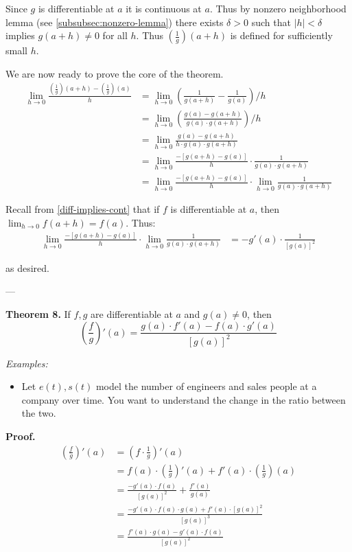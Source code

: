 \vs

Since $g$ is differentiable at $a$ it is continuous at $a$. Thus by
nonzero neighborhood lemma (see \ref{subsubsec:nonzero-lemma}) there
exists $\delta>0$ such that $|h|<\delta$ implies $g(a+h)\neq0$ for all
$h$. Thus $\left(\frac{1}{g}\right)(a+h)$ is defined for sufficiently
small $h$.

\vs

We are now ready to prove the core of the theorem.
\begin{align*}
  \lim_{h\to0}\frac{\left(\frac{1}{g}\right)(a+h)-\left(\frac{1}{g}\right)(a)}{h}
  &=\lim_{h\to0}\left(\frac{1}{g(a+h)}-\frac{1}{g(a)}\right)/h\\
  &=\lim_{h\to0}\left(\frac{g(a)-g(a+h)}{g(a)\cdot g(a+h)}\right)/h\\
  &=\lim_{h\to0}\frac{g(a)-g(a+h)}{h\cdot g(a)\cdot g(a+h)}\\
  &=\lim_{h\to0}\frac{-[g(a+h)-g(a)]}{h}\cdot\frac{1}{g(a)\cdot g(a+h)}\\
  &=\lim_{h\to0}\frac{-[g(a+h)-g(a)]}{h}\cdot\lim_{h\to0}\frac{1}{g(a)\cdot
    g(a+h)}
\end{align*}

Recall from \ref{diff-implies-cont} that if $f$ is differentiable at
$a$, then $\lim_{h\to0}f(a+h)=f(a)$. Thus:
\begin{align*}
  \lim_{h\to0}\frac{-[g(a+h)-g(a)]}{h}\cdot\lim_{h\to0}\frac{1}{g(a)\cdot g(a+h)}
  &=-g'(a)\cdot \frac{1}{[g(a)]^2}
\end{align*}

as desired.

\vs---\vs

\textbf{Theorem 8.} If $f, g$ are differentiable at $a$ and $g(a)\neq0$, then
\[\left(\frac{f}{g}\right)'(a)=\frac{g(a)\cdot f'(a)-f(a)\cdot g'(a)}{[g(a)]^2}\]

\vs

\textit{Examples:}
\begin{itemize}
\item Let $e(t), s(t)$ model the number of engineers and sales people
  at a company over time. You want to understand the change in the
  ratio between the two.
\end{itemize}

\textbf{Proof.}
\begin{align*}
  \left(\frac{f}{g}\right)'(a)&=\left(f\cdot\frac{1}{g}\right)'(a)\\
  &=f(a)\cdot
    \left(\frac{1}{g}\right)'(a)+f'(a)\cdot\left(\frac{1}{g}\right)(a)\\
  &=\frac{-g'(a)\cdot f(a)}{[g(a)]^2}+\frac{f'(a)}{g(a)}\\
  &=\frac{-g'(a)\cdot f(a)\cdot g(a)+f'(a)\cdot [g(a)]^2}{[g(a)]^3}\\
  &=\frac{f'(a)\cdot g(a)-g'(a)\cdot f(a)}{[g(a)]^2}\\
\end{align*}

